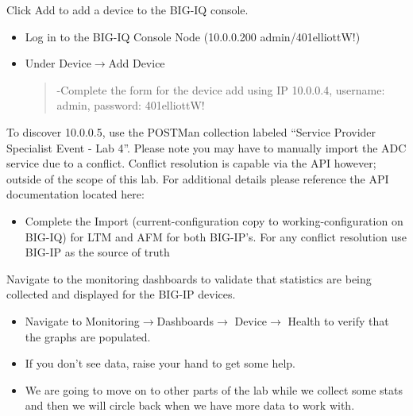 \documentclass[letterpaper,10pt,english]{sphinxmanual}
\begin{document}
Click Add to add a device to the BIG-IQ console.
\begin{itemize}
\item {} 
Log in to the BIG-IQ Console Node (10.0.0.200 admin/401elliottW!)

\item {} 
Under Device\(\rightarrow\)Add Device
\begin{quote}


-Complete the form for the device add using IP 10.0.0.4, username:
admin, password: 401elliottW!

\end{quote}

\end{itemize}


To discover 10.0.0.5, use the POSTMan collection labeled “Service Provider Specialist Event - Lab 4”. Please note you may have to manually import the ADC service due to a conflict. Conflict resolution is capable via the API however; outside of the scope of this lab. For additional details please reference the API documentation located here:

\begin{itemize}
\item {} 
Complete the Import (current-configuration copy to
working-configuration on BIG-IQ) for LTM and AFM for both BIG-IP’s.
For any conflict resolution use BIG-IP as the source of truth


\end{itemize}

Navigate to the monitoring dashboards to validate that statistics are being collected and displayed for the BIG-IP devices.
\begin{itemize}
\item {} 
Navigate to Monitoring\(\rightarrow\)Dashboards\(\rightarrow\) Device\(\rightarrow\) Health to verify that the
graphs are populated.


\item {} 
If you don’t see data, raise your hand to get some help.

\item {} 
We are going to move on to other parts of the lab while we collect
some stats and then we will circle back when we have more data to
work with.

\end{itemize}
\end{document}

